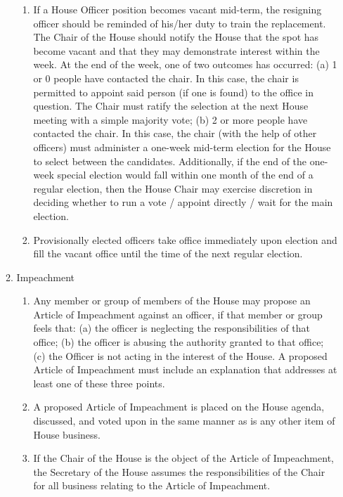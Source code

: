 \documentclass[letterpaper]{article}
\begin{document}
\begin{enumerate}
\begin{enumerate}
\begin{enumerate}
\item If a House Officer position becomes vacant mid-term, the resigning officer should be reminded of his/her duty to train the replacement. The Chair of the House should notify the House that the spot has become vacant and that they may demonstrate interest within the week. At the end of the week, one of two outcomes has occurred: (a) 1 or 0 people have contacted the chair. In this case, the chair is permitted to appoint said person (if one is found) to the office in question. The Chair must ratify the selection at the next House meeting with a simple majority vote; (b) 2 or more people have contacted the chair. In this case, the chair (with the help of other officers) must administer a one-week mid-term election for the House to select between the candidates. Additionally, if the end of the one-week special election
would fall within one month of the end of a regular election, then the House Chair may exercise discretion in deciding whether to run a vote / appoint directly / wait for the main election.

\item Provisionally elected officers take office immediately upon election and fill the vacant office until the time of the next regular election.

\end{enumerate}

\item Impeachment 

\begin{enumerate}

\item Any member or group of members of the House may propose an Article of Impeachment against an officer, if that member or group feels that: (a) the officer is neglecting the responsibilities of that office; (b) the officer is abusing the authority granted to that office; (c) the Officer is not acting in the interest of the House. A proposed Article of Impeachment must include an explanation that addresses at least one of these three points.

\item A proposed Article of Impeachment is placed on the House agenda, discussed, and voted upon in the same manner as is any other item of House business.

\item If the Chair of the House is the object of the Article of Impeachment, the Secretary of the House assumes the responsibilities of the Chair for all business relating to the Article of Impeachment.


\end{enumerate}
\end{enumerate}
\end{enumerate}
\end{document}

